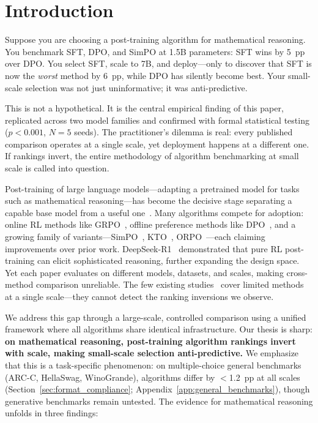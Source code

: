 \documentclass{article}
\begin{document}
\section{Introduction}

Suppose you are choosing a post-training algorithm for mathematical reasoning. You benchmark SFT, DPO, and SimPO at 1.5B parameters: SFT wins by 5~pp over DPO. You select SFT, scale to 7B, and deploy---only to discover that SFT is now the \emph{worst} method by 6~pp, while DPO has silently become best. Your small-scale selection was not just uninformative; it was anti-predictive.

This is not a hypothetical. It is the central empirical finding of this paper, replicated across two model families and confirmed with formal statistical testing ($p < 0.001$, $N{=}5$ seeds). The practitioner's dilemma is real: every published comparison operates at a single scale, yet deployment happens at a different one. If rankings invert, the entire methodology of algorithm benchmarking at small scale is called into question.

Post-training of large language models---adapting a pretrained model for tasks such as mathematical reasoning---has become the decisive stage separating a capable base model from a useful one~\citep{ouyang2022training, touvron2023llama2}. Many algorithms compete for adoption: online RL methods like GRPO~\citep{shao2024deepseekmath}, offline preference methods like DPO~\citep{rafailov2023direct}, and a growing family of variants---SimPO~\citep{meng2024simpo}, KTO~\citep{ethayarajh2024kto}, ORPO~\citep{hong2024orpo}---each claiming improvements over prior work. DeepSeek-R1~\citep{deepseek2025r1} demonstrated that pure RL post-training can elicit sophisticated reasoning, further expanding the design space. Yet each paper evaluates on different models, datasets, and scales, making cross-method comparison unreliable. The few existing studies~\citep{xu2024dpo, spangher2025rlhf} cover limited methods at a single scale---they cannot detect the ranking inversions we observe.

We address this gap through a large-scale, controlled comparison using a unified framework where all algorithms share identical infrastructure. Our thesis is sharp: \textbf{on mathematical reasoning, post-training algorithm rankings invert with scale, making small-scale selection anti-predictive.} We emphasize that this is a task-specific phenomenon: on multiple-choice general benchmarks (ARC-C, HellaSwag, WinoGrande), algorithms differ by $<$1.2~pp at all scales (Section~\ref{sec:format_compliance}; Appendix~\ref{app:general_benchmarks}), though generative benchmarks remain untested. The evidence for mathematical reasoning unfolds in three findings:
\end{document}
